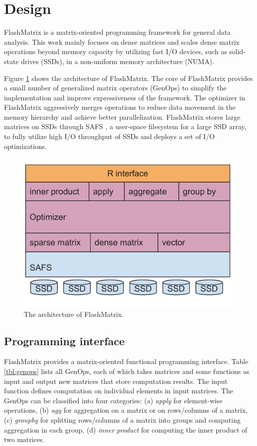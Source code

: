\section{Design}

FlashMatrix is a matrix-oriented programming framework for general data analysis.
This work mainly focuses on dense matrices and scales dense matrix operations
beyond memory capacity by utilizing fast I/O devices, such as solid-state drives
(SSDs), in a non-uniform memory architecture (NUMA).

Figure \ref{fig:arch} shows the architecture of FlashMatrix. The core of
FlashMatrix provides a small number of generalized matrix operators (GenOps)
to simplify the implementation and improve expressiveness of
the framework. The optimizer in FlashMatrix aggressively merges operations to
reduce data movement in the memory hierarchy and achieve better parallelization.
FlashMatrix stores large matrices on SSDs through SAFS \cite{safs},
a user-space filesystem for a large SSD array, to fully utilize high I/O
throughput of SSDs and deploys a set of I/O optimizations.

\begin{figure}
\centering
\includegraphics[scale=0.3]{FlashMatrix_figs/architecture.pdf}
\caption{The architecture of FlashMatrix.}
\label{fig:arch}
\end{figure}

\subsection{Programming interface}

FlashMatrix provides a matrix-oriented functional programming interface.
Table \ref{tbl:genops} lists all GenOps, each of which takes matrices and
some functions as input and output new matrices that store computation results.
The input function defines computation on individual elements in input matrices.
The GenOps can be classified into four categories: (a) \textit{apply} for
element-wise operations, (b) \textit{agg} for aggregation on a matrix
or on rows/columns of a matrix, (c) \textit{groupby} for splitting rows/columns
of a matrix into groups and computing aggregation in each group,
(d) \textit{inner product} for computing the inner product of two matrices.

